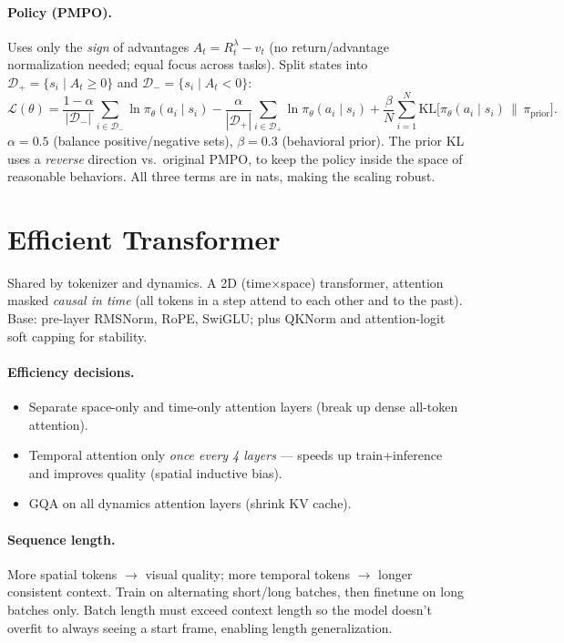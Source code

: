 \documentclass[11pt]{article}
\begin{document}
\paragraph{Policy (PMPO).}
Uses only the \emph{sign} of advantages $A_t = R_t^\lambda - v_t$ (no return/advantage
normalization needed; equal focus across tasks). Split states into
$\mathcal{D}_+ = \{s_i \mid A_t \ge 0\}$ and $\mathcal{D}_- = \{s_i \mid A_t < 0\}$:
\begin{equation}
  \mathcal{L}(\theta) =
  \frac{1-\alpha}{|\mathcal{D}_-|}\sum_{i\in\mathcal{D}_-}\ln\pi_\theta(a_i\mid s_i)
  - \frac{\alpha}{|\mathcal{D}_+|}\sum_{i\in\mathcal{D}_+}\ln\pi_\theta(a_i\mid s_i)
  + \frac{\beta}{N}\sum_{i=1}^{N} \mathrm{KL}\big[\pi_\theta(a_i\mid s_i)\,\big\|\,\pi_{\text{prior}}\big].
\end{equation}
$\alpha = 0.5$ (balance positive/negative sets), $\beta = 0.3$ (behavioral prior).
The prior KL uses a \emph{reverse} direction vs.\ original PMPO, to keep the policy
inside the space of reasonable behaviors. All three terms are in nats, making the
scaling robust.

\section{Efficient Transformer}

Shared by tokenizer and dynamics. A 2D (time$\times$space) transformer, attention masked
\emph{causal in time} (all tokens in a step attend to each other and to the past).
Base: pre-layer RMSNorm, RoPE, SwiGLU; plus QKNorm and attention-logit soft capping for
stability.

\paragraph{Efficiency decisions.}
\begin{itemize}
  \item Separate space-only and time-only attention layers (break up dense
    all-token attention).
  \item Temporal attention only \emph{once every 4 layers} --- speeds up train+inference
    and improves quality (spatial inductive bias).
  \item GQA on all dynamics attention layers (shrink KV cache).
\end{itemize}

\paragraph{Sequence length.}
More spatial tokens $\to$ visual quality; more temporal tokens $\to$ longer consistent
context. Train on alternating short/long batches, then finetune on long batches only.
Batch length must exceed context length so the model doesn't overfit to always seeing a
start frame, enabling length generalization.
\end{document}
